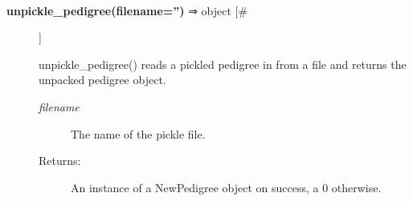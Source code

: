 \begin{description}
\begin{description}
\end{description}
\\ 

\item[\textbf{unpickle\_pedigree(filename='')}
 ⇒ object [\#]]

 unpickle\_pedigree() reads a pickled pedigree in from a file and returns the unpacked pedigree object.
\begin{description}
\item[\emph{filename}
] The name of the pickle file.
\item[Returns:] An instance of a NewPedigree object on success, a 0 otherwise.

\end{description}
\\ 


\end{description}

